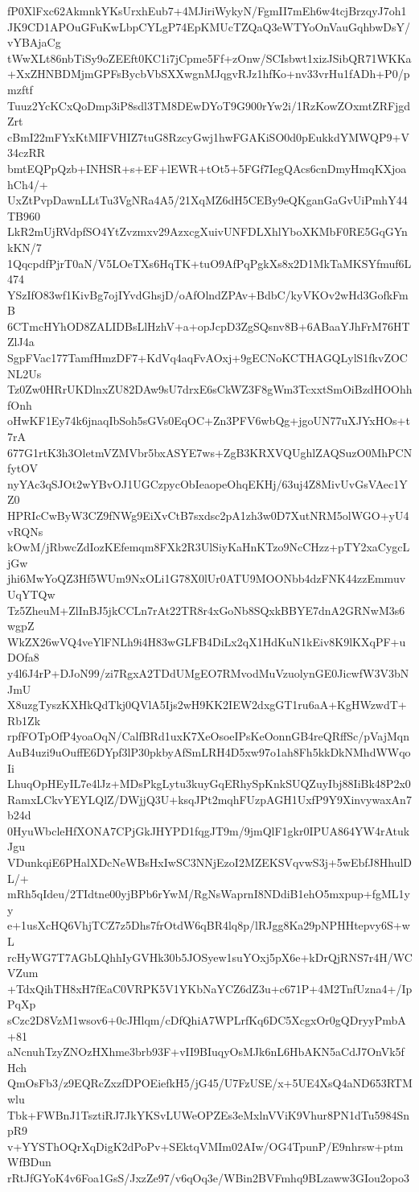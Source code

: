 fP0XlFxc62AkmnkYKsUrxhEub7+4MJiriWykyN/FgmII7mEh6w4tcjBrzqyJ7oh1
JK9CD1APOuGFuKwLbpCYLgP74EpKMUcTZQaQ3eWTYoOnVauGqhbwDsY/vYBAjaCg
tWwXLt86nbTiSy9oZEEft0KC1i7jCpme5Ff+zOnw/SCIsbwt1xizJSibQR71WKKa
+XxZHNBDMjmGPFsBycbVbSXXwgnMJqgvRJz1hfKo+nv33vrHu1fADh+P0/pmzftf
Tuuz2YcKCxQoDmp3iP8sdl3TM8DEwDYoT9G900rYw2i/1RzKowZOxmtZRFjgdZrt
cBmI22mFYxKtMIFVHIZ7tuG8RzcyGwj1hwFGAKiSO0d0pEukkdYMWQP9+V34czRR
bmtEQPpQzb+INHSR+s+EF+lEWR+tOt5+5FGf7IegQAcs6cnDmyHmqKXjoahCh4/+
UxZtPvpDawnLLtTu3VgNRa4A5/21XqMZ6dH5CEBy9eQKganGaGvUiPmhY44TB960
LkR2mUjRVdpfSO4YtZvzmxv29AzxcgXuivUNFDLXhlYboXKMbF0RE5GqGYnkKN/7
1QqcpdfPjrT0aN/V5LOeTXs6HqTK+tuO9AfPqPgkXs8x2D1MkTaMKSYfmuf6L474
YSzIfO83wf1KivBg7ojIYvdGhsjD/oAfOlndZPAv+BdbC/kyVKOv2wHd3GofkFmB
6CTmcHYhOD8ZALIDBsLlHzhV+a+opJcpD3ZgSQsnv8B+6ABaaYJhFrM76HTZlJ4a
SgpFVac177TamfHmzDF7+KdVq4aqFvAOxj+9gECNoKCTHAGQLylS1fkvZOCNL2Us
Tz0Zw0HRrUKDlnxZU82DAw9sU7drxE6sCkWZ3F8gWm3TcxxtSmOiBzdHOOhhfOnh
oHwKF1Ey74k6jnaqIbSoh5sGVs0EqOC+Zn3PFV6wbQg+jgoUN77uXJYxHOs+t7rA
677G1rtK3h3OletmVZMVbr5bxASYE7ws+ZgB3KRXVQUghlZAQSuzO0MhPCNfytOV
nyYAc3qSJOt2wYBvOJ1UGCzpycObIeaopeOhqEKHj/63uj4Z8MivUvGsVAec1YZ0
HPRIcCwByW3CZ9fNWg9EiXvCtB7sxdsc2pA1zh3w0D7XutNRM5olWGO+yU4vRQNs
kOwM/jRbwcZdIozKEfemqm8FXk2R3UlSiyKaHnKTzo9NcCHzz+pTY2xaCygcLjGw
jhi6MwYoQZ3Hf5WUm9NxOLi1G78X0lUr0ATU9MOONbb4dzFNK44zzEmmuvUqYTQw
Tz5ZheuM+ZlInBJ5jkCCLn7rAt22TR8r4xGoNb8SQxkBBYE7dnA2GRNwM3s6wgpZ
WkZX26wVQ4veYlFNLh9i4H83wGLFB4DiLx2qX1HdKuN1kEiv8K9lKXqPF+uDOfa8
y4l6J4rP+DJoN99/zi7RgxA2TDdUMgEO7RMvodMuVzuolynGE0JicwfW3V3bNJmU
X8uzgTyszKXHkQdTkj0QVlA5Ijs2wH9KK2IEW2dxgGT1ru6aA+KgHWzwdT+Rb1Zk
rpfFOTpOfP4yoaOqN/CalfBRd1uxK7XeOsoeIPsKeOonnGB4reQRffSc/pVajMqn
AuB4uzi9uOuffE6DYpf3lP30pkbyAfSmLRH4D5xw97o1ah8Fh5kkDkNMhdWWqoIi
LhuqOpHEyIL7e4lJz+MDsPkgLytu3kuyGqERhySpKnkSUQZuyIbj88IiBk48P2x0
RamxLCkvYEYLQlZ/DWjjQ3U+ksqJPt2mqhFUzpAGH1UxfP9Y9XinvywaxAn7b24d
0HyuWbcleHfXONA7CPjGkJHYPD1fqgJT9m/9jmQlF1gkr0IPUA864YW4rAtukJgu
VDunkqiE6PHalXDcNeWBsHxIwSC3NNjEzoI2MZEKSVqvwS3j+5wEbfJ8HhulDL/+
mRh5qIdeu/2TIdtne00yjBPb6rYwM/RgNsWaprnI8NDdiB1ehO5mxpup+fgML1yy
e+1usXcHQ6VhjTCZ7z5Dhs7frOtdW6qBR4lq8p/lRJgg8Ka29pNPHHtepvy6S+wL
rcHyWG7T7AGbLQhhIyGVHk30b5JOSyew1suYOxj5pX6e+kDrQjRNS7r4H/WCVZum
+TdxQihTH8xH7fEaC0VRPK5V1YKbNaYCZ6dZ3u+c671P+4M2TnfUzna4+/IpPqXp
sCzc2D8VzM1wsov6+0cJHlqm/cDfQhiA7WPLrfKq6DC5XcgxOr0gQDryyPmbA+81
aNcnuhTzyZNOzHXhme3brb93F+vII9BIuqyOsMJk6nL6HbAKN5aCdJ7OnVk5fHch
QmOsFb3/z9EQRcZxzfDPOEiefkH5/jG45/U7FzUSE/x+5UE4XsQ4aND653RTMwlu
Tbk+FWBnJ1TsztiRJ7JkYKSvLUWeOPZEs3eMxlnVViK9Vhur8PN1dTu5984SnpR9
v+YYSThOQrXqDigK2dPoPv+SEktqVMIm02AIw/OG4TpunP/E9nhrsw+ptmWfBDun
rRtJfGYoK4v6Foa1GsS/JxzZe97/v6qOq3e/WBin2BVFmhq9BLzaww3GIou2opo3
